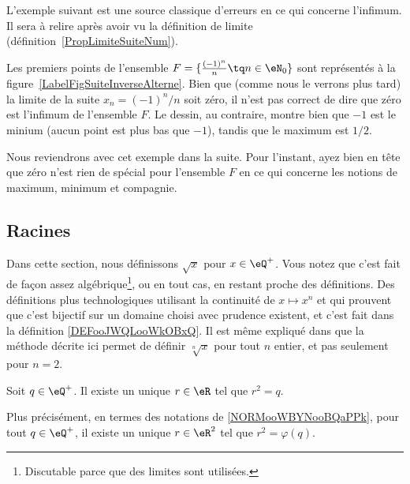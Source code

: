 \newcommand{\CaptionFigSuiteUnSurn}{Les premiers points du type $x_n=1/n$.}


L'exemple suivant est une source classique d'erreurs en ce qui concerne l'infimum. Il sera à relire après avoir vu la définition de limite (définition~\ref{PropLimiteSuiteNum}).

\begin{example}
	Les premiers points de l'ensemble $F=\{ \frac{ (-1)^n }{ n }\tq n\in\eN_0 \}$ sont représentés à la figure~\ref{LabelFigSuiteInverseAlterne}. Bien que (comme nous le verrons plus tard) la limite de la suite $x_n=(-1)^n/n$ soit zéro, il n'est pas correct de dire que zéro est l'infimum de l'ensemble $F$. Le dessin, au contraire, montre bien que $-1$ est le minium (aucun point est plus bas que $-1$), tandis que le maximum est $1/2$.

	Nous reviendrons avec cet exemple dans la suite. Pour l'instant, ayez bien en tête que zéro n'est rien de spécial pour l'ensemble $F$ en ce qui concerne les notions de maximum, minimum et compagnie.
\end{example}
\newcommand{\CaptionFigSuiteInverseAlterne}{Les quelques premiers points du type $(-1)^n/n$.}


\subsection{Racines}
\label{SUBSECooMBCNooEqjjTY}

Dans cette section, nous définissons \( \sqrt{ x }\) pour \( x\in\eQ^+\). Vous notez que c'est fait de façon assez algébrique\footnote{Discutable parce que des limites sont utilisées.}, ou en tout cas, en restant proche des définitions. Des définitions plus technologiques utilisant la continuité de \( x\mapsto x^n\) et qui prouvent que c'est bijectif sur un domaine choisi avec prudence existent, et c'est fait dans la définition \ref{DEFooJWQLooWkOBxQ}. Il est même expliqué dans \cite{BIBooMPXEooQLKhku} que la méthode décrite ici permet de définir \( \sqrt[n]{ x }\) pour tout \( n\) entier, et pas seulement pour \( n=2\).

\begin{proposition}     \label{PROPooUHKFooVKmpte}
    Soit \( q\in \eQ^+\). Il existe un unique \( r\in \eR\) tel que \( r^2=q\).
    
    Plus précisément, en termes des notations de \ref{NORMooWBYNooBQaPPk}, pour tout \( q\in \eQ^+\), il existe un unique \( r\in \eR^2\) tel que \( r^2=\varphi(q)\).
\end{proposition}

